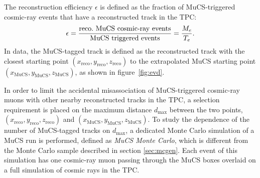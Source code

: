 \documentclass[a4paper,11pt]{article}
\def\myhyphen{{\hbox{-}}}
\begin{document}
The reconstruction efficiency $\epsilon$ is defined as the fraction of MuCS-triggered cosmic-ray events that have a reconstructed track in the TPC:
\begin{equation}\label{eq:eff}
  \epsilon = \frac{\mathrm{reco.~MuCS~cosmic\myhyphen ray~events}}{\mathrm{MuCS~triggered~events}}=\frac{M_{e}}{T_{e}}.
\end{equation}
In data, the MuCS-tagged track is defined as the reconstructed track with the closest starting point $(x_{\mathrm{reco}},y_{\mathrm{reco}},z_{\mathrm{reco}})$ to the extrapolated MuCS starting point $(x_{\mathrm{MuCS}},y_{\mathrm{MuCS}},z_{\mathrm{MuCS}})$, as shown in figure~\ref{fig:evd}. %

In order to limit the accidental misassociation of MuCS-triggered cosmic-ray muons with other nearby reconstructed tracks in the TPC, a selection requirement is placed on the maximum distance $d_{\mathrm{max}}$ between the two points, $(x_{\mathrm{reco}},y_{\mathrm{reco}},z_{\mathrm{reco}})$ and $(x_{\mathrm{MuCS}},y_{\mathrm{MuCS}},z_{\mathrm{MuCS}})$.
To study the dependence of the number of MuCS-tagged tracks on $d_{\mathrm{max}}$, a dedicated Monte Carlo simulation of a MuCS run is performed, defined as \emph{MuCS Monte Carlo}, which is different from the Monte Carlo sample described in section \ref{sec:mcgen}. Each event of this simulation has one cosmic-ray muon passing through the MuCS boxes overlaid on a full simulation of cosmic rays in the TPC.%
\end{document}
